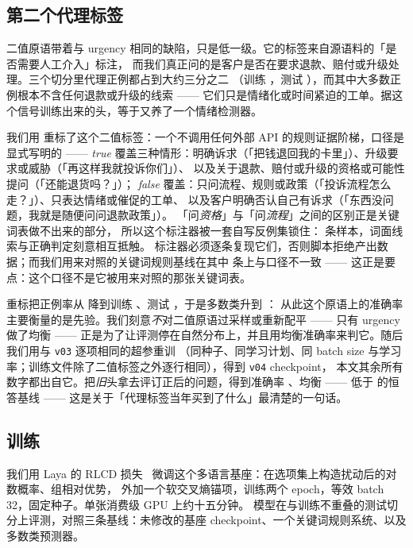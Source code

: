 \documentclass[11pt,a4paper]{article}
\begin{document}
\subsection{第二个代理标签}
\label{sec:noul}

二值原语带着与 urgency 相同的缺陷，只是低一级。它的标签来自源语料的「是否需要人工介入」标注，
而我们真正问的是客户是否在要求退款、赔付或升级处理。三个切分里代理正例都占到大约三分之二
（训练 \NoulPosBefore{}，测试 \NoulPosTestBefore{}），而其中大多数正例根本不含任何退款或升级的线索 ——
它们只是情绪化或时间紧迫的工单。据这个信号训练出来的头，等于又养了一个情绪检测器。

我们用  重标了这个二值标签：一个不调用任何外部 API 的规则证据阶梯，口径是显式写明的 ——
\emph{true} 覆盖三种情形：明确诉求（「把钱退回我的卡里」）、升级要求或威胁（「再这样我就投诉你们」）、
以及关于退款、赔付或升级的资格或可能性提问（「还能退货吗？」）；
\emph{false} 覆盖：只问流程、规则或政策（「投诉流程怎么走？」）、只表达情绪或催促的工单、
以及客户明确否认自己有诉求（「东西没问题，我就是随便问问退款政策」）。
「问\emph{资格}」与「问\emph{流程}」之间的区别正是关键词表做不出来的部分，
所以这个标注器被一套自写反例集锁住：\NoulAntibodyN{} 条样本，词面线索与正确判定刻意相互抵触。
标注器必须逐条复现它们，否则脚本拒绝产出数据；而我们用来对照的关键词规则基线在其中 \NoulGateDisagree{} 条上与口径不一致 ——
这正是要点：这个口径不是它被用来对照的那张关键词表。

重标把正例率从 \NoulPosBefore{} 降到训练 \NoulPosTrainAfter{}、测试 \NoulPosTestAfter{}，于是多数类升到 \NoulMajTestAfter{}：
从此这个原语上的准确率主要衡量的是先验。我们刻意\emph{不}对二值原语过采样或重新配平 —— 只有 urgency 做了均衡 ——
正是为了让评测停在自然分布上，并且用均衡准确率来判它。随后我们用与 \texttt{v03} 逐项相同的超参重训
（同种子、同学习计划、同 batch size 与学习率；训练文件除了二值标签之外逐行相同），得到 \texttt{v04} checkpoint，
本文其余所有数字都出自它。把\emph{旧}头拿去评订正后的问题，得到准确率 \OldHeadAccNoul{}、均衡 \OldHeadBAccNoul{} ——
低于 \MajAccNoul{} 的恒答基线 —— 这是关于「代理标签当年买到了什么」最清楚的一句话。

\subsection{训练}

我们用 Laya 的 RLCD 损失~\cite{laya} 微调这个多语言基座：在选项集上构造扰动后的对数概率、组相对优势，
外加一个软交叉熵锚项，训练两个 epoch，等效 batch 32，固定种子。单张消费级 GPU 上约十五分钟。
模型在与训练不重叠的测试切分上评测，对照三条基线：未修改的基座 checkpoint、一个关键词规则系统、以及多数类预测器。
\end{document}
